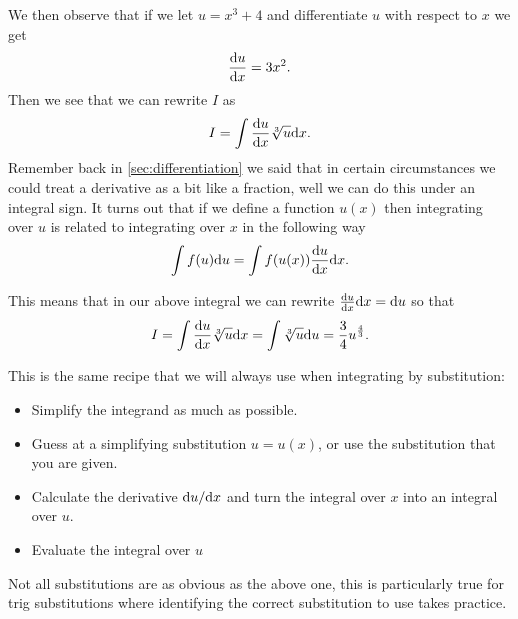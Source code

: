 We then observe that if we let $u=x^{3}+4$ and differentiate $u$ with respect to $x$ we get
\begin{equation*}
\frac{\mathrm{d} u}{\mathrm{d} x}=3x^{2}.
\end{equation*}
Then we see that we can rewrite $I$ as
\begin{equation*}
I=\int \frac{\mathrm{d} u}{\mathrm{d} x}\sqrt[3]{u}\mathrm{d} x.
\end{equation*}
Remember back in \cref{sec:differentiation} we said that in certain circumstances we could treat a derivative as a bit like a fraction, well we can do this under an integral sign. It turns out that if we define a function $u(x)$ then integrating over $u$ is related to integrating over $x$ in the following way
\begin{equation}
\int f(u)\mathrm{d} u=\int f(u(x))\frac{\mathrm{d} u}{\mathrm{d} x}\mathrm{d} x.
\label{eq: measure change of variable}
\end{equation}

This means that in our above integral we can rewrite $\frac{\mathrm{d} u}{\mathrm{d} x}\mathrm{d} x=\mathrm{d} u$ so that
\begin{equation*}
I=\int \frac{\mathrm{d} u}{\mathrm{d} x}\sqrt[3]{u}\mathrm{d} x=\int \sqrt[3]{u}\mathrm{d} u=\frac{3}{4}u^{\frac{4}{3}}.
\end{equation*}

This is the same recipe that we will always use when integrating by substitution:

\begin{itemize}
\item Simplify the integrand as much as possible.
\item Guess at a simplifying substitution $u=u(x)$, or use the substitution that you are given.
\item Calculate the derivative $\mathrm{d} u/\mathrm{d} x$ and turn the integral over $x$ into an integral over $u$.
\item Evaluate the integral over $u$
\end{itemize}

Not all substitutions are as obvious as the above one, this is particularly true for trig substitutions where identifying the correct substitution to use takes practice.

